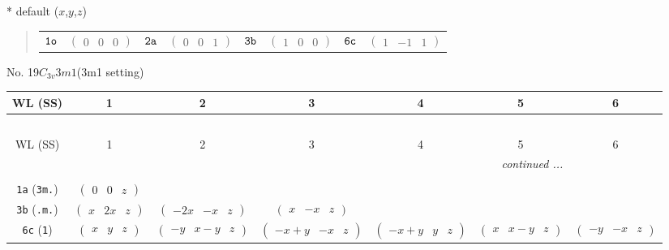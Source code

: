 \documentclass[fleqn,9pt,landscape]{jsarticle}
\begin{document}
* default ($x$,$y$,$z$)
\begin{quote}
\begin{tabular}{cccccccc}
$ {\tt 1o} $ & $ \begin{pmatrix} 0 & 0 & 0 \end{pmatrix} $ & $ {\tt 2a} $ & $ \begin{pmatrix} 0 & 0 & 1 \end{pmatrix} $ & $ {\tt 3b} $ & $ \begin{pmatrix} 1 & 0 & 0 \end{pmatrix} $ & $ {\tt 6c} $ & $ \begin{pmatrix} 1 & -1 & 1 \end{pmatrix} $
\end{tabular}
\end{quote}
\newpage
No. 19\quad$C_{3v}$\quad$3m1$\quad(3m1 setting)\quad[ trigonal ]
\begin{center}
\renewcommand{\arraystretch}{1.2}
\begin{longtable}{ccccccc}
 \hline \hline
WL (SS) & 1 & 2 & 3 & 4 & 5 & 6 \\ \hline \endfirsthead

\multicolumn{6}{l}{\tablename\ \thetable{}} \\
 \hline \hline
WL (SS) & 1 & 2 & 3 & 4 & 5 & 6 \\ \hline \endhead

 \hline \hline
\multicolumn{6}{r}{\footnotesize\it continued ...} \\ \endfoot

 \hline \hline
\multicolumn{6}{r}{} \\ \endlastfoot

{\tt 1a} ({\tt 3m.}) & $ \begin{pmatrix} 0 & 0 & z \end{pmatrix} $ & $  $ & $  $ & $  $ & $  $ & $  $ \\ \hline
{\tt 3b} ({\tt .m.}) & $ \begin{pmatrix} x & 2 x & z \end{pmatrix} $ & $ \begin{pmatrix} - 2 x & - x & z \end{pmatrix} $ & $ \begin{pmatrix} x & - x & z \end{pmatrix} $ & $  $ & $  $ & $  $ \\ \hline
{\tt 6c} ({\tt 1}) & $ \begin{pmatrix} x & y & z \end{pmatrix} $ & $ \begin{pmatrix} - y & x - y & z \end{pmatrix} $ & $ \begin{pmatrix} - x + y & - x & z \end{pmatrix} $ & $ \begin{pmatrix} - x + y & y & z \end{pmatrix} $ & $ \begin{pmatrix} x & x - y & z \end{pmatrix} $ & $ \begin{pmatrix} - y & - x & z \end{pmatrix} $ \\
\end{longtable}
\end{center}
\end{document}
